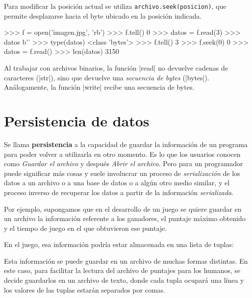 Para modificar la posición actual se utiliza
\lstinline!archivo.seek(posicion)!, que permite desplazarse hacia el byte
ubicado en la posición indicada.

\begin{codigo-python-sn}
>>> f = open('imagen.jpg', 'rb')
>>> f.tell()
0
>>> datos = f.read(3)
>>> datos
b'\xff{}\xff'
>>> type(datos)
<class 'bytes'>
>>> f.tell()
3
>>> f.seek(0)
0
>>> datos = f.read()
>>> len(datos)
3150
\end{codigo-python-sn}

\begin{atencion}
Al trabajar con archivos binarios, la función |read| no devuelve cadenas de
caracteres (|str|), sino que devuelve una {\it secuencia de bytes} (|bytes|).
Análogamente, la función |write| recibe una secuencia de bytes.
\end{atencion}

\section{Persistencia de datos}

Se llama {\bf persistencia} a la capacidad de guardar la
información de un programa para poder volver a utilizarla en otro
momento. Es lo que los usuarios conocen como {\it Guardar el archivo}
y después {\it Abrir el archivo}. Pero para un programador puede
significar más cosas y suele involucrar un proceso de {\it
serialización} de los datos a un archivo o a una base de datos o a
algún otro medio similar, y el proceso inverso de recuperar los
datos a partir de la información {\it serializada}.


Por ejemplo, supongamos que en el desarrollo de un juego se quiere guardar
en un archivo la información referente a los ganadores, el puntaje máximo
obtenido y el tiempo de juego en el que obtuvieron ese puntaje.

En el juego, esa información podría estar almacenada en una lista de
tuplas:
\begin{codigo-python-sn}
\end{codigo-python-sn}

Esta información se puede guardar en un archivo de muchas formas distintas.
En este caso, para facilitar la lectura del archivo de puntajes para los
humanos, se decide guardarlos en un archivo de texto, donde cada tupla
ocupará una línea y los valores de las tuplas estarán separados por
comas.


